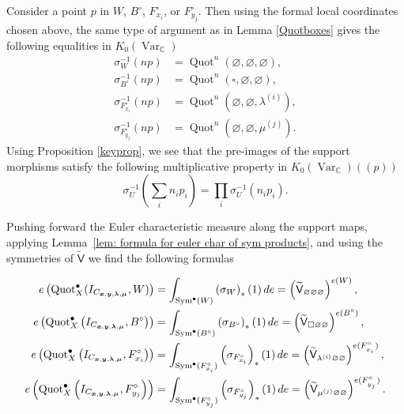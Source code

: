\documentclass[12pt]{amsart}
\theoremstyle{definition}
\newcommand{\CC} {\mathbb{C}}          %
\newcommand{\sfVtilde}{\widetilde{\mathsf{V}}}
\newcommand{\Sym}{\operatorname{Sym}}
\newcommand{\Quot}{\operatorname{Quot}}
\newcommand{\Var}{\operatorname{Var}}
\newcommand{\boldx}{\boldsymbol{x}}
\newcommand{\boldy}{\boldsymbol{y}}
\newcommand{\boldlambda}{\boldsymbol{\lambda }}
\newcommand{\boldmu}{\boldsymbol{\mu }}
\renewcommand{\emptyset}{\varnothing}
\newcommand{\bx}{\square}
\begin{document}
Consider a point $p$ in $W$, $B^{\circ}$, $F_{x_{i}}^{\circ }$, or
$F_{y_{j}}^{\circ}$. Then using the formal local coordinates chosen
above, the same type of argument as in Lemma \ref{Quotboxes} gives the following equalities in $K_0(\Var_{\CC})$ 
\begin{align*}
\sigma_{W}^{-1}(np) &= \Quot^{n}\left(\emptyset ,\emptyset,\emptyset \right), \\
\sigma_{B^{\circ }}^{-1}(np) &= \Quot^{n}\left(\bx ,\emptyset ,\emptyset \right), \\
\sigma_{F_{x_{i}}^{\circ }}^{-1}(np) &= \Quot^{n}\left(\emptyset  ,\emptyset,\lambda^{(i)}  \right), \\
\sigma_{F_{y_{j}}^{\circ }}^{-1}(np) &= \Quot^{n}\left(\emptyset
,\emptyset,\mu^{(j)} \right).
\end{align*}
Using Proposition \ref{keyprop}, we see that the pre-images of the support morphisms satisfy the
following multiplicative property in $K_0(\Var_{\CC})(\!(p)\!)$ 
\[
\sigma^{-1}_{U}\left(\sum_{i}n_{i}p_{i} \right) = \prod_{i}
\sigma^{-1}_{U}\left(n_{i}p_{i} \right).
\]


Pushing forward the Euler characteristic measure along the support
maps, applying Lemma~\ref{lem: formula for euler char of sym
products}, and using the symmetries of $\sfVtilde$ we find the
following formulas



\begin{align}\label{eqn: e(Hilb(Xhat,Bcirc))=V^{e(Bcirc)}}
e\left(\Quot_X^{\bullet}(I_{C_{\boldx, \boldy, \boldlambda, \boldmu}},W) \right) & = \int_{\Sym^{\bullet}(W)}
\left(\sigma_{W} \right)_{*}(1)\, de = \left(\sfVtilde_{\emptyset \emptyset \emptyset }\right)^{e(W)},\\
e\left(\Quot_X^{\bullet}\left(I_{C_{\boldx, \boldy, \boldlambda, \boldmu}},B^{\circ} \right) \right) & = \int_{\Sym^{\bullet}(B^{\circ })}
\left(\sigma_{B^{\circ }} \right)_{*}(1)\, de = \left(\sfVtilde_{\bx \emptyset \emptyset }\right)^{e(B^{\circ })},\nonumber \\
e\left(\Quot_X^{\bullet}\left(I_{C_{\boldx, \boldy, \boldlambda, \boldmu}},F_{x_{i}}^{\circ} \right) \right) & = \int_{\Sym^{\bullet}(F_{x_{i}}^{\circ })}
\left(\sigma_{F_{x_{i}}^{\circ }} \right)_{*}(1)\, de = \left(\sfVtilde_{\lambda^{(i)} \emptyset  \emptyset }\right)^{e(F_{_{x_{i}}}^{\circ })},\nonumber \\
e\left(\Quot_X^{\bullet}\left(I_{C_{\boldx, \boldy, \boldlambda, \boldmu}},F_{y_{j}}^{\circ} \right) \right) & = \int_{\Sym^{\bullet}(F_{y_{j}}^{\circ })}
\left(\sigma_{F_{y_{j}}^{\circ }} \right)_{*}(1)\, de =
\left(\sfVtilde_{\mu^{(j)} \emptyset  \emptyset
}\right)^{e(F_{_{y_{j}}}^{\circ })}. \nonumber
\end{align}
\end{document}
